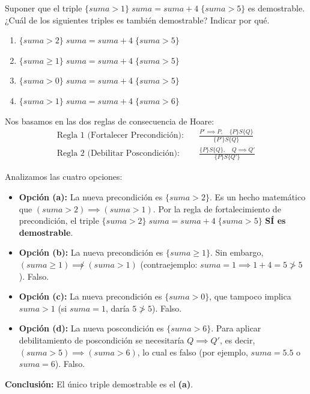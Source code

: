 \begin{ejercicio}
Suponer que el triple $\{suma > 1\} \; suma = suma + 4 \; \{suma > 5\}$ es demostrable. ¿Cuál de los siguientes triples es también demostrable? Indicar por qué.
\begin{enumerate}[label=(\alph*),leftmargin=*]
    \item $\{suma > 2\} \; suma = suma + 4 \; \{suma > 5\}$
    \item $\{suma \ge 1\} \; suma = suma + 4 \; \{suma > 5\}$
    \item $\{suma > 0\} \; suma = suma + 4 \; \{suma > 5\}$
    \item $\{suma > 1\} \; suma = suma + 4 \; \{suma > 6\}$
\end{enumerate}
\end{ejercicio}

\begin{solucion}
Nos basamos en las dos reglas de consecuencia de Hoare:
\begin{align*}
\text{Regla 1 (Fortalecer Precondición):} & \quad \frac{P' \implies P, \quad \{P\} S \{Q\}}{\{P'\} S \{Q\}} \\[6pt]
\text{Regla 2 (Debilitar Poscondición):} & \quad \frac{\{P\} S \{Q\}, \quad Q \implies Q'}{\{P\} S \{Q'\}}
\end{align*}

Analizamos las cuatro opciones:
\begin{itemize}[leftmargin=*]
    \item \textbf{Opción (a):} La nueva precondición es $\{suma > 2\}$.
    Es un hecho matemático que $(suma > 2) \implies (suma > 1)$.
    Por la regla de fortalecimiento de precondición, el triple $\{suma > 2\} \; suma = suma + 4 \; \{suma > 5\}$ \textbf{SÍ es demostrable}.
    \item \textbf{Opción (b):} La nueva precondición es $\{suma \ge 1\}$. Sin embargo, $(suma \ge 1) \not\implies (suma > 1)$ (contraejemplo: $suma = 1 \implies 1 + 4 = 5 \not> 5$). Falso.
    \item \textbf{Opción (c):} La nueva precondición es $\{suma > 0\}$, que tampoco implica $suma > 1$ (si $suma = 1$, daría $5 \not> 5$). Falso.
    \item \textbf{Opción (d):} La nueva poscondición es $\{suma > 6\}$. Para aplicar debilitamiento de poscondición se necesitaría $Q \implies Q'$, es decir, $(suma > 5) \implies (suma > 6)$, lo cual es falso (por ejemplo, $suma = 5.5$ o $suma = 6$). Falso.
\end{itemize}

\textbf{Conclusión:} El único triple demostrable es el \textbf{(a)}.
\end{solucion}

